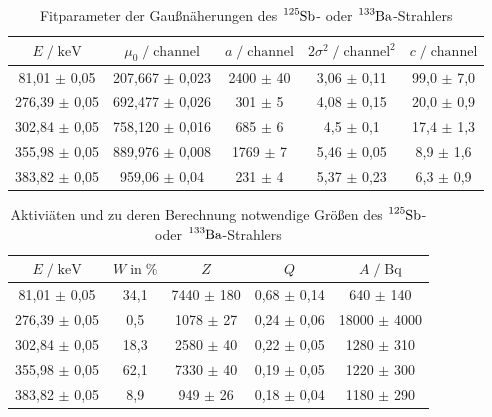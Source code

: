 \begin{table}[H]
  \centering
  \caption{Fitparameter der Gaußnäherungen des $\ce{^{125}Sb}$- oder $\ce{^{133}Ba}$-Strahlers}
  \label{tab:mess4}
  \begin{tabular}{c c c c c}
  \toprule
  $E \;/\; \si{\kilo\eV}$ & $\mu_0 \;/\; \text{channel}$ & $a \;/\; \text{channel}$ & 
  $2\sigma^2 \;/\; \text{channel}^2$ & $c \;/\; \text{channel}$ \\
  \midrule
     81,01 $\pm$ 0,05 & 207,667 $\pm$ 0,023 & 2400 $\pm$ 40 & 3,06 $\pm$ 0,11 & 99,0 $\pm$ 7,0 \\
    276,39 $\pm$ 0,05 & 692,477 $\pm$ 0,026 &  301 $\pm$  5 & 4,08 $\pm$ 0,15 & 20,0 $\pm$ 0,9 \\
    302,84 $\pm$ 0,05 & 758,120 $\pm$ 0,016 &  685 $\pm$  6 & 4,5  $\pm$ 0,1  & 17,4 $\pm$ 1,3 \\
    355,98 $\pm$ 0,05 & 889,976 $\pm$ 0,008 & 1769 $\pm$  7 & 5,46 $\pm$ 0,05 &  8,9 $\pm$ 1,6 \\
    383,82 $\pm$ 0,05 & 959,06  $\pm$ 0,04  &  231 $\pm$  4 & 5,37 $\pm$ 0,23 &  6,3 $\pm$ 0,9 \\
  \bottomrule
  \end{tabular}
\end{table}

\begin{table}[H]
  \centering
  \caption{Aktiviäten und zu deren Berechnung notwendige Größen des $\ce{^{125}Sb}$- oder $\ce{^{133}Ba}$-Strahlers}
  \label{tab:mess5}
  \begin{tabular}{c c c c c}
  \toprule
  $E \;/\; \si{\kilo\eV}$ & $W \;\text{in}\; \si{\percent}$ & $Z$ & $Q$ & $A \;/\; \si{\becquerel}$ \\
  \midrule
     81,01 $\pm$ 0,05 & 34,1 & 7440 $\pm$ 180 & 0,68 $\pm$ 0,14 &   640 $\pm$ 140  \\
    276,39 $\pm$ 0,05 &  0,5 & 1078 $\pm$  27 & 0,24 $\pm$ 0,06 & 18000 $\pm$ 4000 \\
    302,84 $\pm$ 0,05 & 18,3 & 2580 $\pm$  40 & 0,22 $\pm$ 0,05 &  1280 $\pm$ 310  \\
    355,98 $\pm$ 0,05 & 62,1 & 7330 $\pm$  40 & 0,19 $\pm$ 0,05 &  1220 $\pm$ 300  \\
    383,82 $\pm$ 0,05 &  8,9 &  949 $\pm$  26 & 0,18 $\pm$ 0,04 &  1180 $\pm$ 290  \\
  \bottomrule
  \end{tabular}
\end{table}


